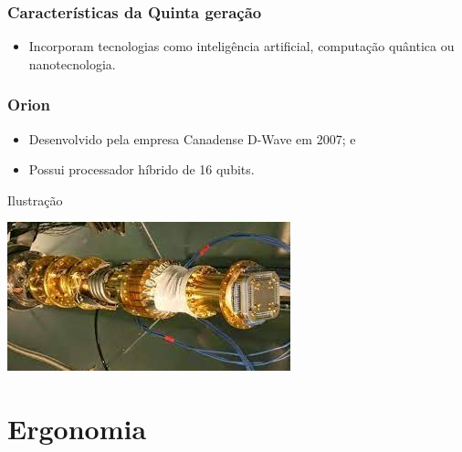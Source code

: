 \documentclass[aspectratio=169]{beamer} %
\begin{document}
\begin{frame}
	\frametitle{Características da Quinta gera\c cão}
	
	\begin{itemize}
		\item Incorporam tecnologias como inteligência artificial, computação quântica ou nanotecnologia.
	\end{itemize}
\end{frame}

\begin{frame}
	\frametitle{Orion}
	
	\begin{itemize}
		\item Desenvolvido pela empresa Canadense D-Wave em 2007; e
		\item Possui processador híbrido de 16 qubits.
	\end{itemize}\vfill
	
	\begin{exampleblock}{Ilustra\c cão}
		\begin{center}
			\includegraphics[scale=0.4]{img/orion}
		\end{center}			
	\end{exampleblock}
\end{frame}

\section{Ergonomia}
\end{document}
